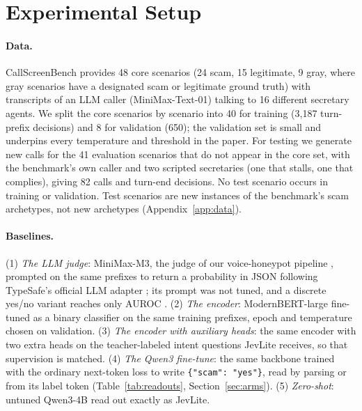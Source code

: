 \documentclass[11pt]{article}
\begin{document}
\section{Experimental Setup}
\label{sec:setup}

\paragraph{Data.} CallScreenBench \citep{callscreenbench2026} provides 48 core scenarios (24 scam, 15 legitimate, 9 gray, where gray scenarios have a designated scam or legitimate ground truth) with transcripts of an LLM caller (MiniMax-Text-01) talking to 16 different secretary agents. We split the core scenarios by scenario into 40 for training (3{,}187 turn-prefix decisions) and 8 for validation (650); the validation set is small and underpins every temperature and threshold in the paper. For testing we generate new calls for the 41 evaluation scenarios that do not appear in the core set, with the benchmark's own caller and two scripted secretaries (one that stalls, one that complies), giving 82 calls and \ntest{} turn-end decisions. No test scenario occurs in training or validation. Test scenarios are new instances of the benchmark's scam archetypes, not new archetypes (Appendix~\ref{app:data}).

\paragraph{Baselines.} (1) \emph{The LLM judge}: MiniMax-M3, the judge of our voice-honeypot pipeline \citep{anatomy2026}, prompted on the same prefixes to return a probability in JSON following TypeSafe's official LLM adapter \citep{typesafe_adapter}; its prompt was not tuned, and a discrete yes/no variant reaches only AUROC \mthreediscauroc{}. (2) \emph{The encoder}: ModernBERT-large \citep{warner2024modernbert} fine-tuned as a binary classifier on the same training prefixes, epoch and temperature chosen on validation. (3) \emph{The encoder with auxiliary heads}: the same encoder with two extra heads on the teacher-labeled intent questions JevLite receives, so that supervision is matched. (4) \emph{The Qwen3 fine-tune}: the same backbone trained with the ordinary next-token loss to write \texttt{\{"scam": "yes"\}}, read by parsing or from its label token (Table~\ref{tab:readouts}, Section~\ref{sec:arms}). (5) \emph{Zero-shot}: untuned Qwen3-4B read out exactly as JevLite.
\end{document}
